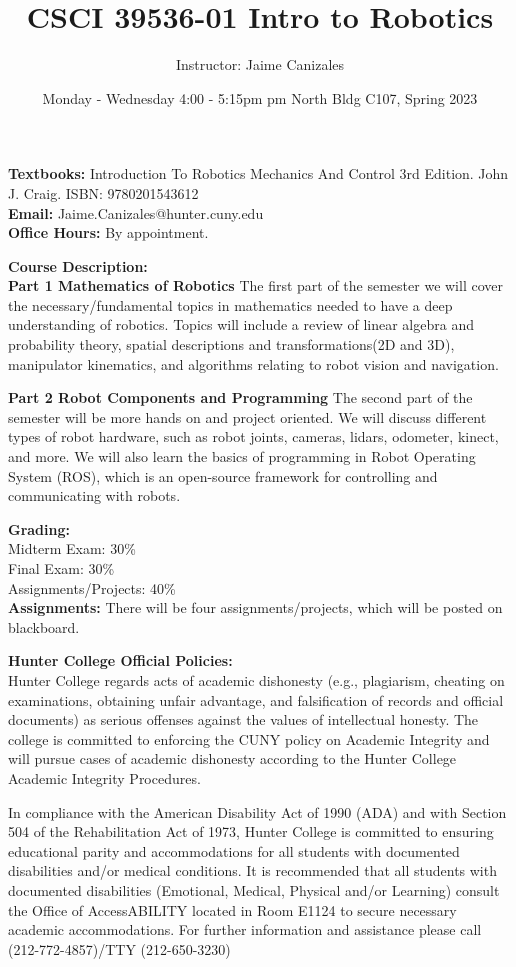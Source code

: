 \documentclass[a4paper]{article}
\title{CSCI 39536-01 Intro to Robotics}
\author{Instructor: Jaime Canizales}
\date{Monday - Wednesday 4:00 - 5:15pm pm North Bldg C107, Spring 2023}
\begin{document}
\maketitle

\textbf{Textbooks:} Introduction To Robotics Mechanics And Control 3rd Edition. John J. Craig. ISBN: 9780201543612\\
\textbf{Email:} Jaime.Canizales@hunter.cuny.edu \\
\textbf{Office Hours:} By appointment.

\textbf{Course Description:}\\ 
\textbf{Part 1 Mathematics of Robotics}
The first part of the semester we will cover the necessary/fundamental topics in mathematics needed to have a deep understanding of robotics. Topics will include a review of linear algebra and probability theory, spatial descriptions and transformations(2D and 3D), manipulator kinematics, and algorithms relating to robot vision and navigation.

\textbf{Part 2 Robot Components and Programming}
The second part of the semester will be more hands on and project oriented. We will discuss different types of robot hardware, such as robot joints, cameras, lidars, odometer, kinect, and more. We will also learn the basics of programming in Robot Operating System (ROS), which is an open-source framework for controlling and communicating with robots.

\textbf{Grading: } \\
Midterm Exam: \hspace{11mm} 30\% \\
Final Exam: \hspace{17mm} 30\% \\
Assignments/Projects: \hspace{1mm} 40\% \\

\textbf{Assignments: } There will be four assignments/projects, which will be posted on blackboard.

\textbf{Hunter College Official Policies:}\\
Hunter College regards acts of academic dishonesty (e.g., plagiarism, cheating on examinations, obtaining
unfair advantage, and falsification of records and official documents) as serious offenses against the values of
intellectual honesty. The college is committed to enforcing the CUNY policy on Academic Integrity and will
pursue cases of academic dishonesty according to the Hunter College Academic Integrity Procedures.
\par In compliance with the American Disability Act of 1990 (ADA) and with Section 504 of the Rehabilitation
Act of 1973, Hunter College is committed to ensuring educational parity and accommodations for all students
with documented disabilities and/or medical conditions. It is recommended that all students with documented
disabilities (Emotional, Medical, Physical and/or Learning) consult the Office of AccessABILITY located in
Room E1124 to secure necessary academic accommodations. For further information and assistance please call
(212-772-4857)/TTY (212-650-3230)\\\\\\
\newpage
\end{document}
